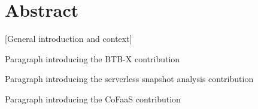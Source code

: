\documentclass[../main.tex]{subfiles}
\begin{document}
\chapter{Abstract}

[General introduction and context]

Paragraph introducing the BTB-X contribution

Paragraph introducing the serverless snapshot analysis contribution

Paragraph introducing the CoFaaS contribution
\end{document}
